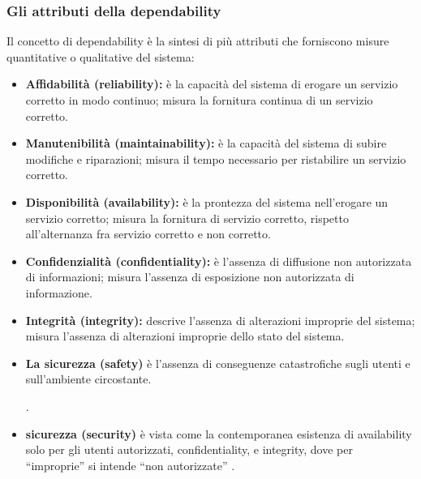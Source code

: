 \documentclass[14pt]{extarticle}
\begin{document}
\subsubsection{Gli attributi della dependability}
Il concetto di dependability è la sintesi di più attributi che forniscono misure
quantitative o qualitative del sistema:
\begin{itemize}
\item \textbf{Affidabilità (reliability):} è la capacità del sistema di erogare un servizio corretto in modo continuo; misura la fornitura continua di un servizio
corretto.
\item \textbf{Manutenibilità (maintainability):} è la capacità del sistema di subire modifiche e riparazioni; misura il tempo necessario per ristabilire un servizio
corretto.
\item \textbf{Disponibilità (availability):} è la prontezza del sistema nell'erogare un
servizio corretto; misura la fornitura di servizio corretto, rispetto all'alternanza fra servizio corretto e non corretto.
\item \textbf{Confidenzialità (confidentiality):} è l'assenza di diffusione non autorizzata di informazioni; misura l'assenza di esposizione non autorizzata di
informazione.
\item \textbf{Integrità (integrity):} descrive l'assenza di alterazioni improprie del sistema; misura l’assenza di alterazioni improprie dello stato del sistema.
\item \textbf{La sicurezza (safety)} è l'assenza di conseguenze catastrofiche sugli
utenti e sull'ambiente circostante. .
\item \textbf{sicurezza (security)} è vista come la contemporanea esistenza di availability solo per gli utenti autorizzati, confidentiality, e
integrity, dove per “improprie” si intende “non autorizzate” \cite{nicol2004model}.
\end{itemize}
\end{document}

